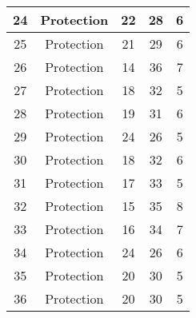 \documentclass[results.tex]{subfiles}
\begin{document}
\begin{center}
\begin{tabular}{| c || c | c | c | c |}
            \hline
            24                      & Protection                   & 22                     & 28                      & 6                    \\
            \hline
            25                      & Protection                   & 21                     & 29                      & 6                    \\
            \hline
            26                      & Protection                   & 14                     & 36                      & 7                    \\
            \hline
            27                      & Protection                   & 18                     & 32                      & 5                    \\
            \hline
            28                      & Protection                   & 19                     & 31                      & 6                    \\
            \hline
            29                      & Protection                   & 24                     & 26                      & 5                    \\
            \hline
            30                      & Protection                   & 18                     & 32                      & 6                    \\
            \hline
            31                      & Protection                   & 17                     & 33                      & 5                    \\
            \hline
            32                      & Protection                   & 15                     & 35                      & 8                    \\
            \hline
            33                      & Protection                   & 16                     & 34                      & 7                    \\
            \hline
            34                      & Protection                   & 24                     & 26                      & 6                    \\
            \hline
            35                      & Protection                   & 20                     & 30                      & 5                    \\
            \hline
            36                      & Protection                   & 20                     & 30                      & 5                    \\

\end{tabular}
\end{center}
\end{document}
